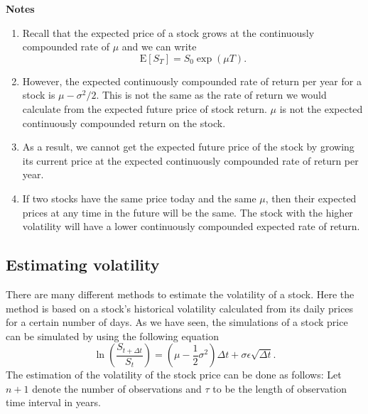 \documentclass[landscape, 20pt]{extreport}
\theoremstyle{definition}
\theoremstyle{definition}
\theoremstyle{definition}
\theoremstyle{definition}
\theoremstyle{remark}
\begin{document}
\textbf{Notes}

\begin{enumerate}
\def\labelenumi{\arabic{enumi}.}
\item
  Recall that the expected price of a stock grows at the continuously
  compounded rate of \(\mu\) and we can write
  \[\mathrm{E}[S_T] = S_0 \exp(\mu T).\]
\item
  However, the expected continuously compounded rate of return per
  year for a stock is \(\mu - \sigma^2/2\). This is not the same as the
  rate of return we would calculate from the expected future price of
  stock return. \(\mu\) is not the expected continuously compounded
  return on the stock.
\item
  As a result, we cannot get the expected future price of the stock by
  growing its current price at the expected continuously compounded
  rate of return per year.
\item
  If two stocks have the same price today and the same \(\mu\), then
  their expected prices at any time in the future will be the same.
  The stock with the higher volatility will have a lower continuously
  compounded expected rate of return.
\end{enumerate}

\hypertarget{estimating-volatility}{%
\subsection{Estimating volatility}\label{estimating-volatility}}

There are many different methods to estimate the volatility of a stock.
Here the method is based on a stock's historical volatility calculated
from its daily prices for a certain number of days. As we have seen, the
simulations of a stock price can be simulated by using the following
equation
\[\ln\left(  \frac{S_{t+\Delta t}}{S_t} \right) = (\mu - \frac{1}{2}\sigma^2 )\Delta t + \sigma \epsilon \sqrt{\Delta t}.\]
The estimation of the volatility of the stock price can be done as
follows: Let \(n+1\) denote the number of observations and \(\tau\) to be
the length of observation time interval in years.
\end{document}
